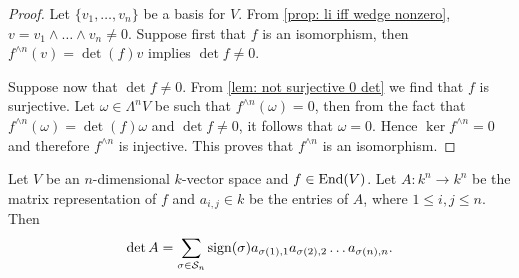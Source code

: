 \begin{proof}
Let \(\{v_1, \dots, v_n\}\) be a basis for \(V\). From \cref{prop: li iff
wedge nonzero}, \(v = v_1 \wedge \dots \wedge v_n \neq 0\).  Suppose first
that \(f\) is an isomorphism, then \(f^{\wedge n}(v) = \det(f) v\) implies
\(\det f \neq 0\).

Suppose now that \(\det f \neq 0\). From \cref{lem: not surjective 0 det} we
find that \(f\) is surjective. Let \(\omega \in \Lambda^n V\) be such that
\(f^{\wedge n}(\omega) = 0\), then from the fact that \(f^{\wedge n}(\omega) =
\det(f) \omega\) and \(\det f \neq 0\), it follows that \(\omega = 0\). Hence
\(\ker f^{\wedge n} = 0\) and therefore \(f^{\wedge n}\) is injective. This
proves that \(f^{\wedge n}\) is an isomorphism.
\end{proof}

\begin{proposition}
\label{prop: matrix det}
Let \(V\) be an \(n\)-dimensional \(k\)-vector space and \(f \in \operatorname{End}(V)\).
Let \(A: k^n \to k^n\) be the matrix representation of \(f\) and \(a_{i, j}
\in k\) be the entries of \(A\), where \(1 \leq i, j \leq n\). Then
\[
  \det A = \sum_{\sigma \in \mathcal S_n} \operatorname{sign}(\sigma) a_{\sigma(1), 1}
  a_{\sigma(2), 2} \dots a_{\sigma(n), n}.
\]
\end{proposition}

